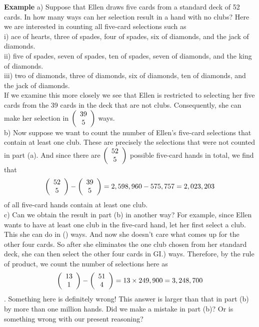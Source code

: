 \documentclass[11pt]{article}
\begin{document}
\textbf{Example} a) Suppose that Ellen draws five cards from a standard deck of 52 cards. In how many ways can her selection result in a hand with no clubs? Here we are interested in counting all five-card selections such as\\
i) ace of hearts, three of spades, four of spades, six of diamonds, and the jack of diamonds.\\
ii) five of spades, seven of spades, ten of spades, seven of diamonds, and the king of diamonds.\\
iii) two of diamonds, three of diamonds, six of diamonds, ten of diamonds, and the jack of diamonds.\\
If we examine this more closely we see that Ellen is restricted to selecting her five cards from the 39 cards in the deck that are not clubs. Consequently, she can make her selection in 
$\left( {\begin{array}{*{20}c}  39  \\  5  \\ \end{array}} \right)$ 
ways.\\
b) Now suppose we want to count the number of Ellen's five-card selections that contain at least one club. These are precisely the selections that were not counted in part (a). And since there are
$\left( {\begin{array}{*{20}c} 52  \\ 5  \\ \end{array}} \right)$ 
possible five-card hands in total, we find that 
$$ \left( {\begin{array}{*{20}c} 52  \\ 5  \\ \end{array}} \right) - \left( {\begin{array}{*{20}c} 39  \\ 5  \\ \end{array}} \right) = 2,598,960 - 575,757 = 2,023,203  $$
of all five-card hands contain at least one club.\\
c) Can we obtain the result in part (b) in another way? For example, since Ellen wants to have at least one club in the five-card hand, let her first select a club. This she can do in () ways. And now she doesn't care what comes up for the other four cards. So after she eliminates the one club chosen from her standard deck, she can then select the other four cards in GI.) ways. Therefore, by the rule of product, we count the number of selections here as 
$$ \left( {\begin{array}{*{20}c} 13  \\ 1  \\ \end{array}} \right) - \left( {\begin{array}{*{20}c} 51  \\ 4  \\ \end{array}} \right) = 13 \times 249,900 = 3,248,700  $$.
Something here is definitely wrong! This answer is larger than that in part (b) by more than one million hands. Did we make a mistake in part (b)? Or is something wrong with our present reasoning?
\end{document}
